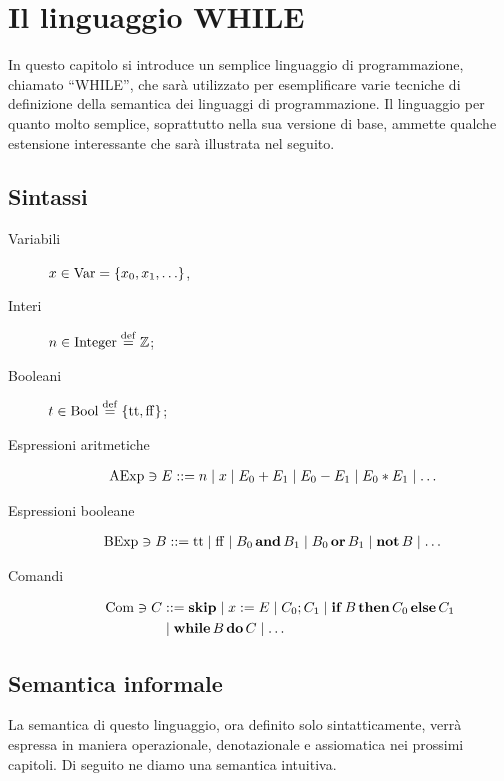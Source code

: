 \chapter{Il linguaggio WHILE}

In questo capitolo si introduce un semplice linguaggio di programmazione,
chiamato ``WHILE'',
che sarà utilizzato per esemplificare varie tecniche di definizione della
semantica dei linguaggi di programmazione.
Il linguaggio per quanto molto semplice, soprattutto nella sua versione di
base, ammette qualche estensione interessante che sarà illustrata nel
seguito.

\section{Sintassi}

\begin{description}
\item[Variabili]
$x \in \mathrm{Var} = \{ x_0, x_1, \ldots \}$,%
\item[Interi]
$n \in \Integer \defeq \Zset$;
\item[Booleani]
$t \in \Bool \defeq \{ \ttv, \ffv \}$;
\item[Espressioni aritmetiche]%
\begin{align*}
  \mathrm{AExp} \ni
  E &::= n \mathrel{\mid} x \mathrel{\mid} E_0 + E_1 \mathrel{\mid} E_0 - E_1 \mathrel{\mid} E_0 * E_1 \mathrel{\mid} \ldots
\end{align*}
\item[Espressioni booleane]%
\begin{align*}
  \mathrm{BExp} \ni
  B &::= \mathrm{tt} \mathrel{\mid} \mathrm{ff} \mathrel{\mid} B_0 \mathop{\textup{\textbf{and}}} B_1 \mathrel{\mid} B_0 \mathop{\textup{\textbf{or}}} B_1
              \mathrel{\mid} \mathop{\textup{\textbf{not}}} B \mathrel{\mid} \ldots
\end{align*}
\item[Comandi]%
\begin{align*}
  \mathrm{Com} \ni
  C &::= \mathop{\textup{\textbf{skip}}} \mathrel{\mid} x := E \mathrel{\mid} C_0 ; C_1
         \mathrel{\mid} \mathop{\textup{\textbf{if}}} B \mathop{\textup{\textbf{then}}} C_0 \mathop{\textup{\textbf{else}}} C_1 \\
    &\mathrel{\mid} \mathop{\textup{\textbf{while}}} B \mathop{\textup{\textbf{do}}} C \mathrel{\mid} \ldots
\end{align*}
\end{description}

\section{Semantica informale} 

La semantica di questo linguaggio, ora definito solo sintatticamente,
verrà espressa in maniera operazionale, denotazionale e assiomatica
nei prossimi capitoli. Di seguito ne diamo una semantica
intuitiva.

